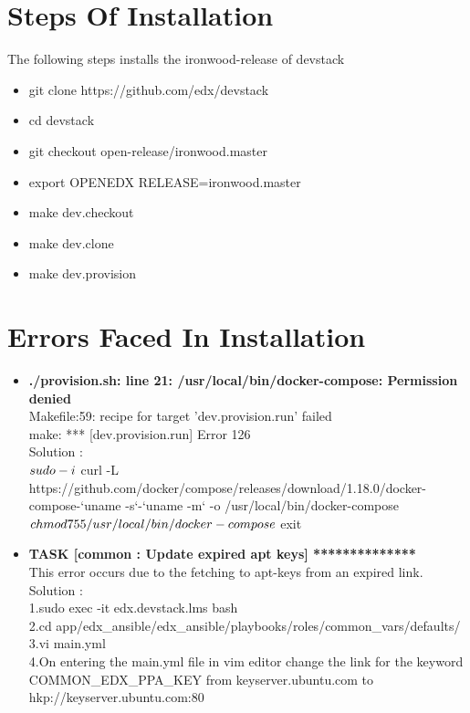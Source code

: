 \documentclass[11pt]{report}
\begin{document}
	\section{Steps Of Installation}
	\large
	The following steps installs the ironwood-release of devstack 
	\begin{itemize}
		\item git clone https://github.com/edx/devstack
		\item cd devstack
		\item git checkout open-release/ironwood.master
		\item export OPENEDX RELEASE=ironwood.master
		\item make dev.checkout
		\item make dev.clone
		\item make dev.provision
	\end{itemize}
	
	\section{Errors Faced In Installation}
	\begin{itemize}
		\item \textbf{./provision.sh: line 21: /usr/local/bin/docker-compose: Permission denied} \ \\
		Makefile:59: recipe for target 'dev.provision.run' failed \ \\
		make: *** [dev.provision.run] Error 126 \ \\
		Solution : \ \\
		$ sudo -i  \ \\
		$ curl -L \ \\ https://github.com/docker/compose/releases/download/1.18.0/docker-compose-`uname -s`-`uname -m` -o /usr/local/bin/docker-compose \ \\
		$ chmod 755 /usr/local/bin/docker-compose \ \\
		$ exit \ \\
		
		\item \textbf{TASK [common : Update expired apt keys] **************} \ \\
		This error occurs due to the fetching to apt-keys from an expired link. \ \\
		Solution : \ \\
		1.sudo exec -it edx.devstack.lms bash \ \\
		2.cd app/edx\_ansible/edx\_ansible/playbooks/roles/common\_vars/defaults/ 
		3.vi main.yml \ \\
		4.On entering the main.yml file in vim editor change the link for the keyword
		COMMON\_EDX\_PPA\_KEY from keyserver.ubuntu.com to  hkp://keyserver.ubuntu.com:80 \ \\
	\end{itemize}
	
\end{document}
